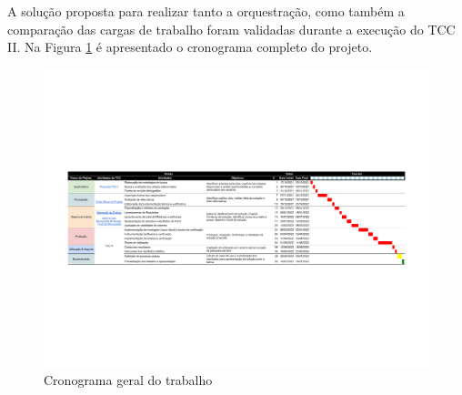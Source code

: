 A solução proposta para realizar tanto a orquestração, como também a comparação das cargas de trabalho foram validadas durante a execução do TCC II.
Na Figura \ref{fig:cronograma} é apresentado o cronograma completo do projeto.

\begin{landscape}
\begin{figure}[!ht]
    \centering
    \includegraphics[width=\linewidth]{04-figuras/TCC cronograma - Sheet1.pdf}
    \caption{Cronograma geral do trabalho}
    \label{fig:cronograma}
\end{figure}
\end{landscape}